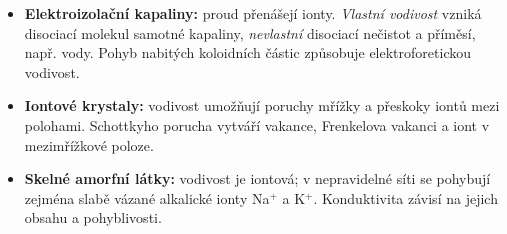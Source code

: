 \begin{itemize}
\item \textbf{Elektroizolační kapaliny:} proud přenášejí ionty. \emph{Vlastní vodivost} vzniká disociací molekul samotné kapaliny, \emph{nevlastní} disociací nečistot a příměsí, např. vody. Pohyb nabitých koloidních částic způsobuje elektroforetickou vodivost.
\item \textbf{Iontové krystaly:} vodivost umožňují poruchy mřížky a přeskoky iontů mezi polohami. Schottkyho porucha vytváří vakance, Frenkelova vakanci a iont v mezimřížkové poloze.
\item \textbf{Skelné amorfní látky:} vodivost je iontová; v nepravidelné síti se pohybují zejména slabě vázané alkalické ionty Na$^+$ a K$^+$. Konduktivita závisí na jejich obsahu a pohyblivosti.
\end{itemize}
